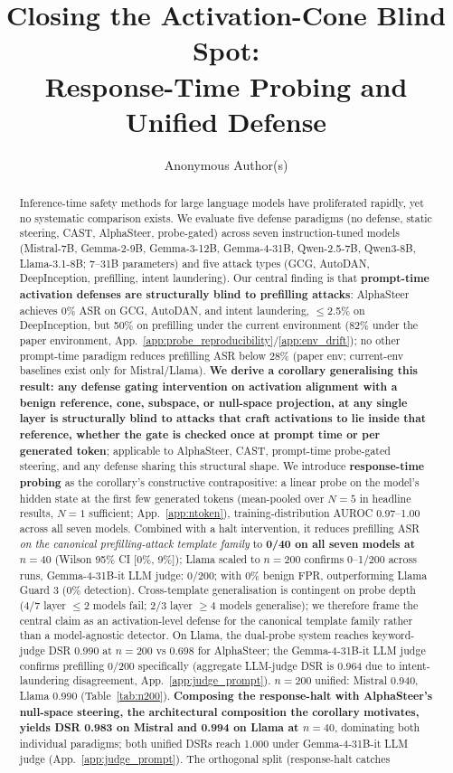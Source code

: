 \documentclass{article}
\title{Closing the Activation-Cone Blind Spot: \\ Response-Time Probing and Unified Defense}
\author{%
  Anonymous Author(s)%
}
\begin{document}
\maketitle

\begin{abstract}
Inference-time safety methods for large language models have proliferated rapidly, yet no systematic comparison exists. We evaluate five defense paradigms (no defense, static steering, CAST, AlphaSteer, probe-gated) across seven instruction-tuned models (Mistral-7B, Gemma-2-9B, Gemma-3-12B, Gemma-4-31B, Qwen-2.5-7B, Qwen3-8B, Llama-3.1-8B; 7--31B parameters) and five attack types (GCG, AutoDAN, DeepInception, prefilling, intent laundering). Our central finding is that \textbf{prompt-time activation defenses are structurally blind to prefilling attacks}: AlphaSteer achieves 0\% ASR on GCG, AutoDAN, and intent laundering, $\leq$2.5\% on DeepInception, but 50\% on prefilling under the current environment (82\% under the paper environment, App.~\ref{app:probe_reproducibility}/\ref{app:env_drift}); no other prompt-time paradigm reduces prefilling ASR below 28\% (paper env; current-env baselines exist only for Mistral/Llama). \textbf{We derive a corollary generalising this result: any defense gating intervention on activation alignment with a benign reference, cone, subspace, or null-space projection, at any single layer is structurally blind to attacks that craft activations to lie inside that reference, whether the gate is checked once at prompt time or per generated token}; applicable to AlphaSteer, CAST, prompt-time probe-gated steering, and any defense sharing this structural shape. We introduce \textbf{response-time probing} as the corollary's constructive contrapositive: a linear probe on the model's hidden state at the first few generated tokens (mean-pooled over $N=5$ in headline results, $N=1$ sufficient; App.~\ref{app:ntoken}), training-distribution AUROC 0.97--1.00 across all seven models. Combined with a halt intervention, it reduces prefilling ASR \emph{on the canonical prefilling-attack template family} to \textbf{0/40 on all seven models at $n=40$} (Wilson 95\% CI [0\%, 9\%]); Llama scaled to $n=200$ confirms 0--1/200 across runs, Gemma-4-31B-it LLM judge: 0/200; with 0\% benign FPR, outperforming Llama Guard 3 (0\% detection). Cross-template generalisation is contingent on probe depth (4/7 layer $\leq 2$ models fail; 2/3 layer $\geq 4$ models generalise); we therefore frame the central claim as an activation-level defense for the canonical template family rather than a model-agnostic detector. On Llama, the dual-probe system reaches keyword-judge DSR 0.990 at $n=200$ vs 0.698 for AlphaSteer; the Gemma-4-31B-it LLM judge confirms prefilling 0/200 specifically (aggregate LLM-judge DSR is 0.964 due to intent-laundering disagreement, App.~\ref{app:judge_prompt}). $n=200$ unified: Mistral 0.940, Llama 0.990 (Table~\ref{tab:n200}). \textbf{Composing the response-halt with AlphaSteer's null-space steering, the architectural composition the corollary motivates, yields DSR 0.983 on Mistral and 0.994 on Llama at $n=40$}, dominating both individual paradigms; both unified DSRs reach 1.000 under Gemma-4-31B-it LLM judge (App.~\ref{app:judge_prompt}). The orthogonal split (response-halt catches 
\end{abstract}
\end{document}
